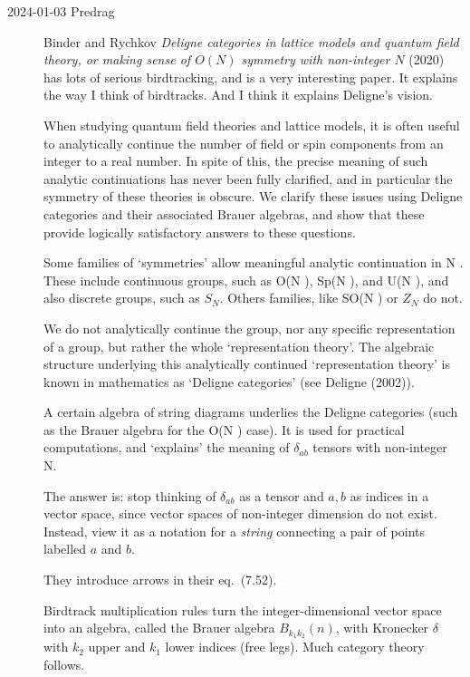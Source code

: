 \begin{description}
\item[2024-01-03 Predrag]
        \label{2024-01-03PC}
Binder and Rychkov
{\em Deligne categories in lattice models and quantum field theory, or
making sense of {$O(N)$} symmetry with non-integer {$N$}}
(2020)  has lots of serious birdtracking, and is a very interesting paper. It explains the way I think of birdtracks.
And I think it explains Deligne's vision.

When studying quantum field theories and lattice models, it is often useful
to analytically continue the number of field or spin components from an integer to a real
number. In spite of this, the precise meaning of such analytic continuations has never been
fully clarified, and in particular the symmetry of these theories is obscure. We clarify these
issues using Deligne categories and their associated Brauer algebras, and show that these
provide logically satisfactory answers to these questions.

Some families of `symmetries' allow meaningful analytic continuation in N . These
include continuous groups, such as O(N ), Sp(N ), and U(N ), and also discrete groups,
such as $S_N$. Others families, like SO(N ) or  $Z_N$ do not.

We do not analytically continue the group, nor any specific representation of a group,
but rather the whole `representation theory'. The algebraic structure underlying this
analytically continued `representation theory' is known in mathematics as `Deligne
categories' (see 
{Deligne (2002)}).

A certain algebra of string diagrams underlies the Deligne categories
(such as the Brauer algebra for the O(N ) case). It is used for practical
computations, and `explains' the meaning of $\delta_{ab}$ tensors with
non-integer N.

The answer is: stop thinking of $\delta_{ab}$ as a tensor and ${a,b}$ as
indices in a vector space, since vector spaces of non-integer dimension
do not exist. Instead, view it as a notation for a \emph{string}
connecting a pair of points labelled ${a}$ and ${b}$.

They introduce arrows in their eq.~(7.52).

Birdtrack multiplication rules turn the integer-dimensional vector space into an algebra,
called the Brauer algebra $B_{k_1k_2}(n)$, with Kronecker $\delta$ with
 $k_2$ upper and  $k_1$  lower indices (free legs).  Much category theory follows.


\end{description}
